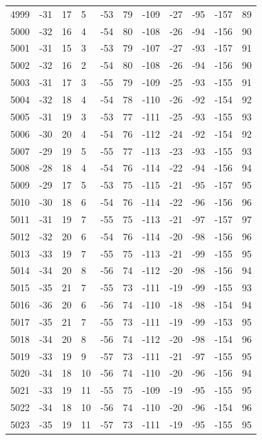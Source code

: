 \begin{table}[H]
\begin{tabular}{lllllllllll}
4999 & -31 & 17 & 5 & -53 & 79 & -109 & -27 & -95 & -157 & 89 \\
5000 & -32 & 16 & 4 & -54 & 80 & -108 & -26 & -94 & -156 & 90 \\
5001 & -31 & 15 & 3 & -53 & 79 & -107 & -27 & -93 & -157 & 91 \\
5002 & -32 & 16 & 2 & -54 & 80 & -108 & -26 & -94 & -156 & 90 \\
5003 & -31 & 17 & 3 & -55 & 79 & -109 & -25 & -93 & -155 & 91 \\
5004 & -32 & 18 & 4 & -54 & 78 & -110 & -26 & -92 & -154 & 92 \\
5005 & -31 & 19 & 3 & -53 & 77 & -111 & -25 & -93 & -155 & 93 \\
5006 & -30 & 20 & 4 & -54 & 76 & -112 & -24 & -92 & -154 & 92 \\
5007 & -29 & 19 & 5 & -55 & 77 & -113 & -23 & -93 & -155 & 93 \\
5008 & -28 & 18 & 4 & -54 & 76 & -114 & -22 & -94 & -156 & 94 \\
5009 & -29 & 17 & 5 & -53 & 75 & -115 & -21 & -95 & -157 & 95 \\
5010 & -30 & 18 & 6 & -54 & 76 & -114 & -22 & -96 & -156 & 96 \\
5011 & -31 & 19 & 7 & -55 & 75 & -113 & -21 & -97 & -157 & 97 \\
5012 & -32 & 20 & 6 & -54 & 76 & -114 & -20 & -98 & -156 & 96 \\
5013 & -33 & 19 & 7 & -55 & 75 & -113 & -21 & -99 & -155 & 95 \\
5014 & -34 & 20 & 8 & -56 & 74 & -112 & -20 & -98 & -156 & 94 \\
5015 & -35 & 21 & 7 & -55 & 73 & -111 & -19 & -99 & -155 & 93 \\
5016 & -36 & 20 & 6 & -56 & 74 & -110 & -18 & -98 & -154 & 94 \\
5017 & -35 & 21 & 7 & -55 & 73 & -111 & -19 & -99 & -153 & 95 \\
5018 & -34 & 20 & 8 & -56 & 74 & -112 & -20 & -98 & -154 & 96 \\
5019 & -33 & 19 & 9 & -57 & 73 & -111 & -21 & -97 & -155 & 95 \\
5020 & -34 & 18 & 10 & -56 & 74 & -110 & -20 & -96 & -156 & 94 \\
5021 & -33 & 19 & 11 & -55 & 75 & -109 & -19 & -95 & -155 & 95 \\
5022 & -34 & 18 & 10 & -56 & 74 & -110 & -20 & -96 & -154 & 96 \\
5023 & -35 & 19 & 11 & -57 & 73 & -111 & -19 & -95 & -155 & 95 \\

\end{tabular}
\end{table}
